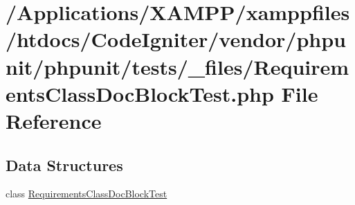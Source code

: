 \hypertarget{_requirements_class_doc_block_test_8php}{}\section{/\+Applications/\+X\+A\+M\+P\+P/xamppfiles/htdocs/\+Code\+Igniter/vendor/phpunit/phpunit/tests/\+\_\+files/\+Requirements\+Class\+Doc\+Block\+Test.php File Reference}
\label{_requirements_class_doc_block_test_8php}
\subsection*{Data Structures}
\begin{DoxyCompactItemize}
\item 
class \mbox{\hyperlink{class_requirements_class_doc_block_test}{Requirements\+Class\+Doc\+Block\+Test}}
\end{DoxyCompactItemize}
